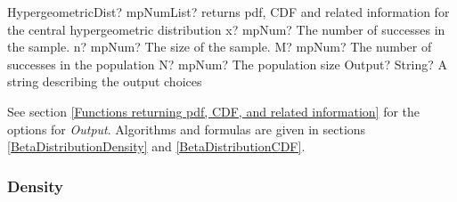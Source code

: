 \begin{mpFunctionsExtract}
	\mpFunctionFive
	{HypergeometricDist? mpNumList? returns pdf, CDF and related information for the central hypergeometric distribution}
	{x? mpNum? The number of successes in the sample.}
	{n? mpNum? The size of the sample.}
	{M? mpNum? The number of successes in the population}
	{N? mpNum? The population size}
	{Output? String? A string describing the output choices}
\end{mpFunctionsExtract}


\vspace{0.3cm}
See section \ref{Functions returning pdf, CDF, and related information} for the options for {\itshape\sffamily Output}. Algorithms and formulas are given in sections \ref{BetaDistributionDensity} and \ref{BetaDistributionCDF}.


%
%
%
%




\subsubsection{Density}
\label{HypergeometricDistributionDensity}

